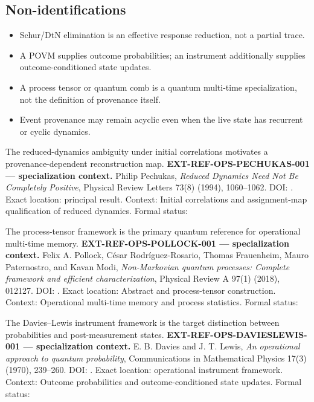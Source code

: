 \subsection{Non-identifications}\label{non-identifications}

\begin{itemize}
\tightlist
\item
  Schur/DtN elimination is an effective response reduction, not a
  partial trace.
\item
  A POVM supplies outcome probabilities; an instrument additionally
  supplies outcome-conditioned state updates.
\item
  A process tensor or quantum comb is a quantum multi-time
  specialization, not the definition of provenance itself.
\item
  Event provenance may remain acyclic even when the live state has
  recurrent or cyclic dynamics.
\end{itemize}

The reduced-dynamics ambiguity under initial correlations motivates a
provenance-dependent reconstruction map.
\textbf{EXT-REF-OPS-PECHUKAS-001 --- specialization context.} Philip
Pechukas, \emph{Reduced Dynamics Need Not Be Completely Positive},
Physical Review Letters 73(8) (1994), 1060--1062. DOI:
\texttt{\protect{}}. Exact location: principal result.
Context: Initial correlations and assignment-map qualification of
reduced dynamics. Formal status:
\texttt{\protect{}}

The process-tensor framework is the primary quantum reference for
operational multi-time memory. \textbf{EXT-REF-OPS-POLLOCK-001 ---
specialization context.} Felix A. Pollock, César Rodríguez-Rosario,
Thomas Frauenheim, Mauro Paternostro, and Kavan Modi,
\emph{Non-Markovian quantum processes: Complete framework and efficient
characterization}, Physical Review A 97(1) (2018), 012127. DOI:
\texttt{\protect{}}. Exact location: Abstract and
process-tensor construction. Context: Operational multi-time memory and
process statistics. Formal status:
\texttt{\protect{}}

The Davies--Lewis instrument framework is the target distinction between
probabilities and post-measurement states.
\textbf{EXT-REF-OPS-DAVIESLEWIS-001 --- specialization context.} E. B.
Davies and J. T. Lewis, \emph{An operational approach to quantum
probability}, Communications in Mathematical Physics 17(3) (1970),
239--260. DOI: \texttt{\protect{}}. Exact location: operational
instrument framework. Context: Outcome probabilities and
outcome-conditioned state updates. Formal status:
\texttt{\protect{}}

